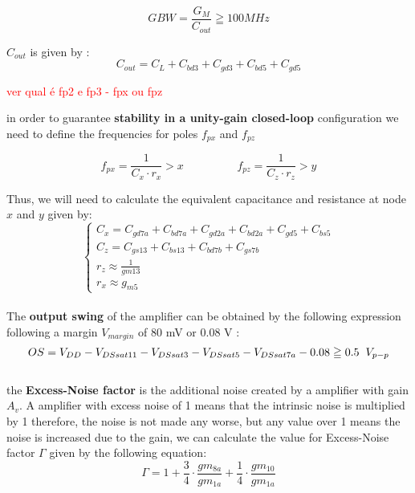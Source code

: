 $$  GBW = \frac{G_M}{C_{out}} \geqq 100 MHz $$

$C_{out}$ is given by :\\

$$C_{out} = C_L + C_{bd3} + C_{gd3} + C_{bd5} + C_{gd5}$$

\newpage

\textcolor{red}{ver qual é fp2 e fp3 - fpx ou fpz }

in order to guarantee \textbf{stability in a unity-gain closed-loop} configuration we need to define the frequencies
for poles $f_{px}$ and  $f_{pz}$

$$f_{px} = \frac{1}{C_x\cdot r_x} > x  \hspace{2cm}  f_{pz} = \frac{1}{C_z\cdot r_z} > y$$

Thus, we will need to calculate the equivalent capacitance and resistance at node $x$ and $y$ given by:\\

\begin{equation}
    \begin{cases}
        C_x = C_{gd7a} + C_{bd7a}+ C_{gd2a} + C_{bd2a} + C_{gd5} + C_{bs5}\\
        C_z = C_{gs13} + C_{bs13} + C_{bd7b}+ C_{gs7b} \\
        r_z \approx \frac{1}{gm13} \\
        r_x \approx g_{m5} 
    \end{cases}
\end{equation}\\

The \textbf{output swing} of the amplifier can be obtained by the following expression following a margin $V_{margin}$ of 80 mV or 0.08 V :\\

$$OS = V_{DD} - V_{DSsat11} - V_{DSsat3} - V_{DSsat5} - V_{DSsat7a} - 0.08  \geqq  0.5 \hspace{0.2cm} V_{p-p}$$\\

the \textbf{Excess-Noise factor} is the additional noise created by a amplifier with gain $A_v$. A amplifier with excess noise of 1 means that the intrinsic noise is multiplied by 1 therefore, the noise is not made any worse, but any value over 1 means the noise is increased due to the gain, we can calculate the value for Excess-Noise factor $\Gamma$ given by the following equation:\\

$$\Gamma = 1 + \frac{3}{4}\cdot \frac{gm_{8a}}{gm_{1a}} + \frac{1}{4}\cdot \frac{gm_{10}}{gm_{1a}}$$

